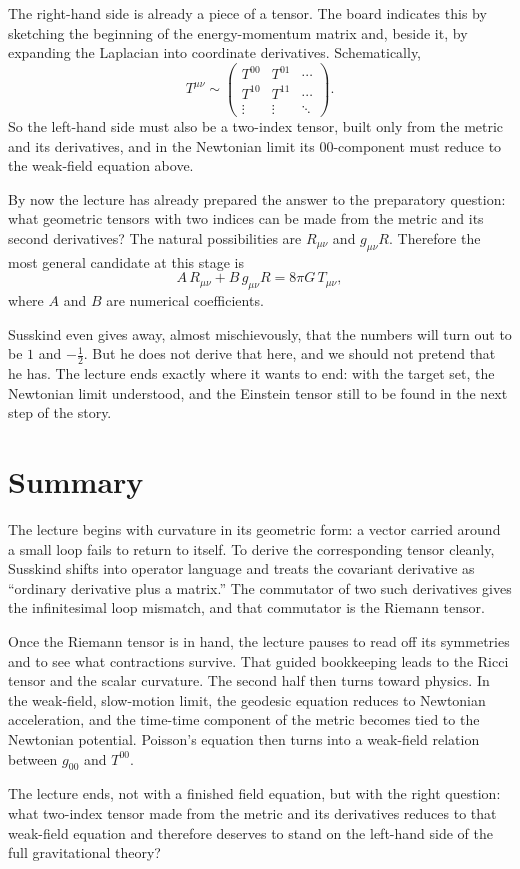 The right-hand side is already a piece of a tensor. The board indicates this by sketching the beginning of the energy-momentum matrix and, beside it, by expanding the Laplacian into coordinate derivatives. Schematically,
\begin{equation}
T^{\mu\nu}\sim
\left(
\begin{array}{ccc}
T^{00} & T^{01} & \cdots \\
T^{10} & T^{11} & \cdots \\
\vdots & \vdots & \ddots
\end{array}
\right).
\end{equation}
So the left-hand side must also be a two-index tensor, built only from the metric and its derivatives, and in the Newtonian limit its \(00\)-component must reduce to the weak-field equation above.

By now the lecture has already prepared the answer to the preparatory question: what geometric tensors with two indices can be made from the metric and its second derivatives? The natural possibilities are \(R_{\mu\nu}\) and \(g_{\mu\nu}R\). Therefore the most general candidate at this stage is
\begin{equation}
A\,R_{\mu\nu}+B\,g_{\mu\nu}R = 8\pi G\,T_{\mu\nu},
\end{equation}
where \(A\) and \(B\) are numerical coefficients.

Susskind even gives away, almost mischievously, that the numbers will turn out to be \(1\) and \(-\tfrac12\). But he does not derive that here, and we should not pretend that he has. The lecture ends exactly where it wants to end: with the target set, the Newtonian limit understood, and the Einstein tensor still to be found in the next step of the story.

\section{Summary}

The lecture begins with curvature in its geometric form: a vector carried around a small loop fails to return to itself. To derive the corresponding tensor cleanly, Susskind shifts into operator language and treats the covariant derivative as ``ordinary derivative plus a matrix.'' The commutator of two such derivatives gives the infinitesimal loop mismatch, and that commutator is the Riemann tensor.

Once the Riemann tensor is in hand, the lecture pauses to read off its symmetries and to see what contractions survive. That guided bookkeeping leads to the Ricci tensor and the scalar curvature. The second half then turns toward physics. In the weak-field, slow-motion limit, the geodesic equation reduces to Newtonian acceleration, and the time-time component of the metric becomes tied to the Newtonian potential. Poisson's equation then turns into a weak-field relation between \(g_{00}\) and \(T^{00}\).

The lecture ends, not with a finished field equation, but with the right question: what two-index tensor made from the metric and its derivatives reduces to that weak-field equation and therefore deserves to stand on the left-hand side of the full gravitational theory?